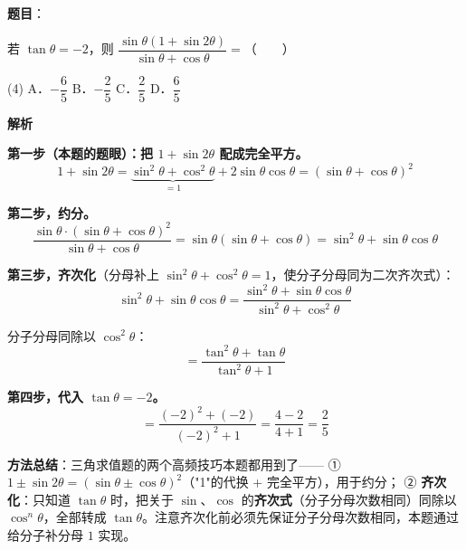 \begin{answer}

\textbf{题目}：

若 $\tan\theta=-2$，则 $\dfrac{\sin\theta(1+\sin2\theta)}{\sin\theta+\cos\theta}=$\mbox{（　　）}

\begin{gkopts}(4)
\task A．$-\dfrac65$
\task B．$-\dfrac25$
\task C．$\dfrac25$
\task D．$\dfrac65$
\end{gkopts}

\textbf{解析}

\textbf{第一步（本题的题眼）：把 $1+\sin2\theta$ 配成完全平方。}
\nopagebreak[4]
\[1+\sin2\theta=\underbrace{\sin^{2}\theta+\cos^{2}\theta}_{=1}+2\sin\theta\cos\theta=(\sin\theta+\cos\theta)^{2}\]

\textbf{第二步，约分。}
\nopagebreak[4]
\[\frac{\sin\theta\cdot(\sin\theta+\cos\theta)^{2}}{\sin\theta+\cos\theta}=\sin\theta(\sin\theta+\cos\theta)=\sin^{2}\theta+\sin\theta\cos\theta\]

\textbf{第三步，齐次化}（分母补上 $\sin^{2}\theta+\cos^{2}\theta=1$，使分子分母同为二次齐次式）：
\nopagebreak[4]
\[\sin^{2}\theta+\sin\theta\cos\theta=\frac{\sin^{2}\theta+\sin\theta\cos\theta}{\sin^{2}\theta+\cos^{2}\theta}\]

分子分母同除以 $\cos^{2}\theta$：
\nopagebreak[4]
\[=\frac{\tan^{2}\theta+\tan\theta}{\tan^{2}\theta+1}\]

\textbf{第四步，代入 $\tan\theta=-2$。}
\nopagebreak[4]
\[=\frac{(-2)^{2}+(-2)}{(-2)^{2}+1}=\frac{4-2}{4+1}=\frac25\]

\begin{gktip}
\textbf{方法总结}：三角求值题的两个高频技巧本题都用到了——
① \textbf{$1\pm\sin2\theta=(\sin\theta\pm\cos\theta)^{2}$}（"1"的代换 + 完全平方），用于约分；
② \textbf{齐次化}：只知道 $\tan\theta$ 时，把关于 $\sin$、$\cos$ 的\textbf{齐次式}（分子分母次数相同）同除以 $\cos^{n}\theta$，全部转成 $\tan\theta$。注意齐次化前必须先保证分子分母次数相同，本题通过给分子补分母 $1$ 实现。
\end{gktip}


\par\medskip

\end{answer}
